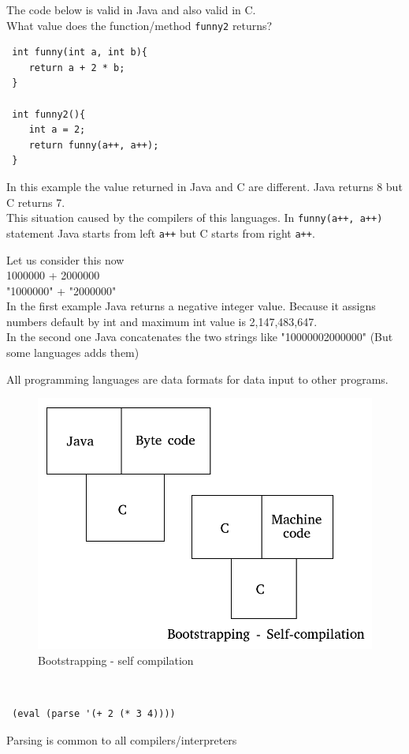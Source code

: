 \documentclass{article}
\begin{document}
\begin{flushleft}
The code below is valid in Java and also valid in C. \\
What value does the function/method \verb|funny2| returns?

\begin{verbatim}
 int funny(int a, int b){
    return a + 2 * b;
 }
 
 int funny2(){
    int a = 2;
    return funny(a++, a++);
 }
\end{verbatim}

In this example the value returned in Java and C are different. Java returns 8 but C returns 7.\\
This situation caused by the compilers of this languages. In \verb|funny(a++, a++)| statement Java starts from left \verb|a++| but C starts from right \verb|a++|.\linebreak

Let us consider this now\\
1000000 + 2000000\\
"1000000" + "2000000"\\
In the first example Java returns a negative integer value. Because it assigns numbers default by int and maximum int value is 2,147,483,647.\\
In the second one Java concatenates the two strings like "10000002000000" (But some languages adds them)\linebreak

All programming languages are data formats for data input to other programs.\\
\begin{figure}[h]
   \centering
   \includegraphics[scale=.2]{bootstrapping.png}
   \caption{Bootstrapping - self compilation}
  \end{figure}
\\
\begin{verbatim}
 (eval (parse '(+ 2 (* 3 4))))
\end{verbatim}
Parsing is common to all compilers/interpreters
\end{flushleft}
\pagebreak
\end{document}
